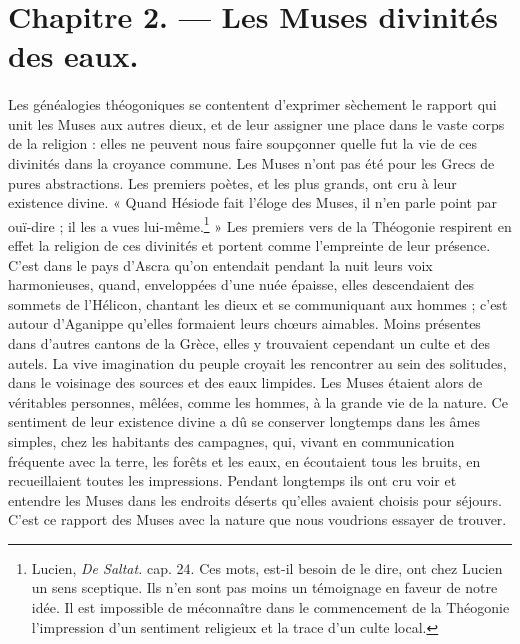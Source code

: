 \documentclass[a4paper, 11pt, oneside, polutonikogreek, french]{article}
\begin{document}
\section{Chapitre 2. --- Les Muses divinités des eaux.}
\paragraph{}
Les généalogies théogoniques se contentent d'exprimer sèchement le rapport qui unit les Muses aux autres dieux, et de leur assigner une place dans le vaste corps de la religion : elles ne peuvent nous faire soupçonner quelle fut la vie de ces divinités dans la croyance commune. Les Muses n'ont pas été pour les Grecs de pures abstractions. Les premiers poètes, et les plus grands, ont cru à leur existence divine. « Quand Hésiode fait l'éloge des Muses, il n'en parle point par ouï-dire ; il les a vues lui-même.\footnote{Lucien, \emph{De Saltat.} cap. 24. Ces mots, est-il besoin de le dire, ont chez Lucien un sens sceptique. Ils n'en sont pas moins un témoignage en faveur de notre idée. Il est impossible de méconnaître dans le commencement de la Théogonie l'impression d'un sentiment religieux et la trace d'un culte local.} » Les premiers vers de la Théogonie respirent en effet la religion de ces divinités et portent comme l'empreinte de leur présence. C'est dans le pays d'Ascra qu'on entendait pendant la nuit leurs voix harmonieuses, quand, enveloppées d'une nuée épaisse, elles descendaient des sommets de l'Hélicon, chantant les dieux et se communiquant aux hommes ; c'est autour d'Aganippe qu'elles formaient leurs chœurs aimables. Moins présentes dans d'autres cantons de la Grèce, elles y trouvaient cependant un culte et des autels. La vive imagination du peuple croyait les rencontrer au sein des solitudes, dans le voisinage des sources et des eaux limpides. Les Muses étaient alors de véritables personnes, mêlées, comme les hommes, à la grande vie de la nature. Ce sentiment de leur existence divine a dû se conserver longtemps dans les âmes simples, chez les habitants des campagnes, qui, vivant en communication fréquente avec la terre, les forêts et les eaux, en écoutaient tous les bruits, en recueillaient toutes les impressions. Pendant longtemps ils ont cru voir et entendre les Muses dans les endroits déserts qu'elles avaient choisis pour séjours. C'est ce rapport des Muses avec la nature que nous voudrions essayer de trouver.
\end{document}
